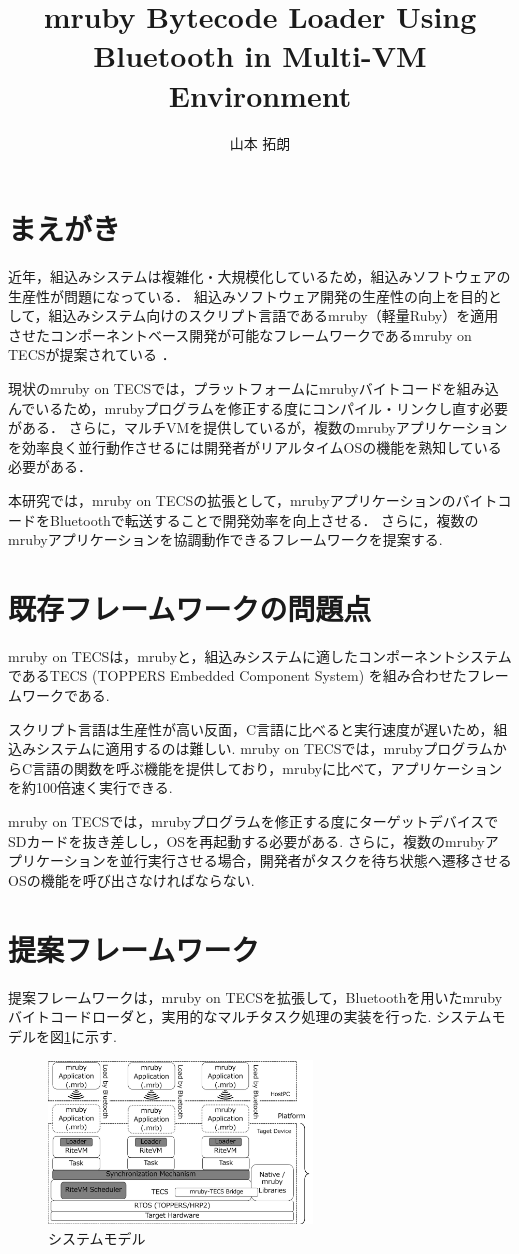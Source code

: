 \documentclass[a4j,10pt,twocolumn]{utf8/abstract}
\title{mruby Bytecode Loader Using Bluetooth in Multi-VM Environment}	%
\author{山本 拓朗} 		%
\begin{document}
\absttitle 		%

\section{まえがき}
近年，組込みシステムは複雑化・大規模化しているため，組込みソフトウェアの生産性が問題になっている．
組込みソフトウェア開発の生産性の向上を目的として，組込みシステム向けのスクリプト言語であるmruby（軽量Ruby）を適用させたコンポーネントベース開発が可能なフレームワークであるmruby on TECSが提案されている \cite{mrubyontecs}．

現状のmruby on TECSでは，プラットフォームにmrubyバイトコードを組み込んでいるため，mrubyプログラムを修正する度にコンパイル・リンクし直す必要がある．
さらに，マルチVMを提供しているが，複数のmrubyアプリケーションを効率良く並行動作させるには開発者がリアルタイムOSの機能を熟知している必要がある．

本研究では，mruby on TECSの拡張として，mrubyアプリケーションのバイトコードをBluetoothで転送することで開発効率を向上させる．
さらに，複数のmrubyアプリケーションを協調動作できるフレームワークを提案する.

\section{既存フレームワークの問題点}
mruby on TECSは，mrubyと，組込みシステムに適したコンポーネントシステムであるTECS (TOPPERS Embedded Component System) を組み合わせたフレームワークである.

スクリプト言語は生産性が高い反面，C言語に比べると実行速度が遅いため，組込みシステムに適用するのは難しい.
mruby on TECSでは，mrubyプログラムからC言語の関数を呼ぶ機能を提供しており，mrubyに比べて，アプリケーションを約100倍速く実行できる.

mruby on TECSでは，mrubyプログラムを修正する度にターゲットデバイスでSDカードを抜き差しし，OSを再起動する必要がある.
さらに，複数のmrubyアプリケーションを並行実行させる場合，開発者がタスクを待ち状態へ遷移させるOSの機能を呼び出さなければならない.
　
\section{提案フレームワーク}
提案フレームワークは，mruby on TECSを拡張して，Bluetoothを用いたmrubyバイトコードローダと，実用的なマルチタスク処理の実装を行った.
システムモデルを図\ref{fig:system_model}に示す.
\begin{figure}[h]
    \centering
    \includegraphics[width=7cm,clip]{Abst_SystemModel.pdf}
    \caption{システムモデル}
    \label{fig:system_model}
\end{figure}
\end{document}
